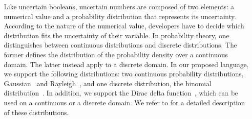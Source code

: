 Like uncertain booleans, uncertain numbers are composed of two elements: a numerical value and a probability distribution that represents its uncertainty.
According to the nature of the numerical value, developers have to decide which distribution fits the uncertainty of their variable. 
In probability theory, one distinguishes between continuous distributions and discrete distributions.
The former defines the distribution of the probability density over a continuous domain.
The latter instead apply to a discrete domain.
In our proposed language, we support the following distributions: two continuous probability distributions, Gaussian~\cite{walck1996hand} and Rayleigh~\cite{walck1996hand}, and one discrete distribution, the binomial distribution~\cite{walck1996hand}.
In addition, we support the Dirac delta function~\cite{gelfand1964}, which can be used on a continuous or a discrete domain.
We refer to  for a detailed description of these distributions.
%
